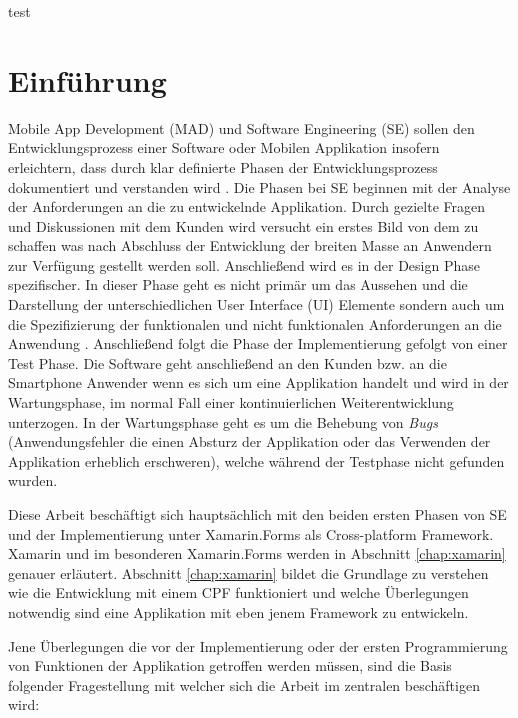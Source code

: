 %
%
% 
% 

test
\chapter{Einführung}
\label{chap:intro}
	Mobile App Development (MAD) und Software Engineering (SE) sollen den Entwicklungsprozess einer Software oder Mobilen Applikation insofern erleichtern, dass durch klar definierte Phasen der Entwicklungsprozess dokumentiert und verstanden wird \cite{Anthony2010}. Die Phasen bei SE beginnen mit der Analyse der Anforderungen an die zu entwickelnde Applikation. Durch gezielte Fragen und Diskussionen mit dem Kunden wird versucht ein erstes Bild von dem zu schaffen was nach Abschluss der Entwicklung der breiten Masse an Anwendern zur Verfügung gestellt werden soll. Anschließend wird es in der Design Phase spezifischer. In dieser Phase geht es nicht primär um das Aussehen und die Darstellung der unterschiedlichen User Interface (UI) Elemente sondern auch um die Spezifizierung der funktionalen und nicht funktionalen Anforderungen an die Anwendung \cite{Anthony2010}. Anschließend folgt die Phase der Implementierung gefolgt von einer Test Phase. Die Software geht anschließend an den Kunden bzw. an die Smartphone Anwender wenn es sich um eine Applikation handelt und wird in der Wartungsphase, im normal Fall einer kontinuierlichen Weiterentwicklung unterzogen. In der Wartungsphase geht es um die Behebung von \textit{Bugs} (Anwendungsfehler die einen Absturz der Applikation oder das Verwenden der Applikation erheblich erschweren), welche während der Testphase nicht gefunden wurden. 

	Diese Arbeit beschäftigt sich hauptsächlich mit den beiden ersten Phasen von SE und der Implementierung unter Xamarin.Forms als Cross-platform Framework. Xamarin und im besonderen Xamarin.Forms werden in Abschnitt \ref{chap:xamarin} genauer erläutert. Abschnitt \ref{chap:xamarin} bildet die Grundlage zu verstehen wie die Entwicklung mit einem CPF funktioniert und welche Überlegungen notwendig sind eine Applikation mit eben jenem Framework zu entwickeln.

	Jene Überlegungen die vor der Implementierung oder der ersten Programmierung von Funktionen der Applikation getroffen werden müssen, sind die Basis folgender Fragestellung mit welcher sich die Arbeit im zentralen beschäftigen wird:\vspace{1cm}

